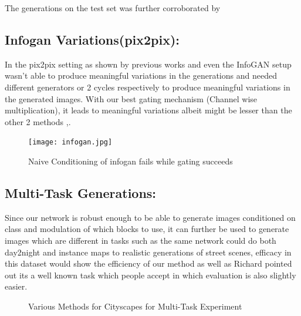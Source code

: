 The generations on the test set was further corroborated by 

\subsection{Infogan Variations(pix2pix):}
In the pix2pix setting as shown by previous works \cite{ghosh2017multi} and \cite{zhu2017toward} even the InfoGAN setup wasn't able to produce meaningful variations in the generations and needed different generators or 2 cycles respectively to produce meaningful variations in the generated images. With our best gating mechanism (Channel wise multiplication), it leads to meaningful variations albeit might be lesser than the other 2 methods \cite{ghosh2017multi} ,\cite{zhu2017toward}.

\begin{figure}
    \centering
    \texttt{[image: infogan.jpg]}
    \caption{Naive Conditioning of infogan fails while gating succeeds}\label{fig:infogan_gate}
    \vspace{-4mm}
\end{figure}

\subsection{Multi-Task Generations: }
Since our network is robust enough to be able to generate images conditioned on class and modulation of which blocks to use, it can further be used to generate images which are different in tasks such as the same network could do both day2night and instance maps to realistic generations of street scenes, efficacy in this dataset would show the efficiency of our method as well as Richard pointed out its a well known task which people accept in which evaluation is also slightly easier.


\begin{figure}%
    \centering
    \caption{Various Methods for Cityscapes for Multi-Task Experiment}
    \label{fig:multi-task_cityscapes}
    \vspace{-3mm}
\end{figure}

